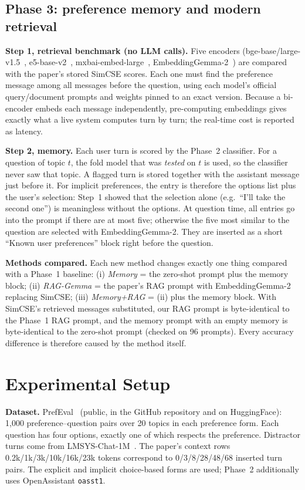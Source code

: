\documentclass[lettersize,journal]{IEEEtran}
\begin{document}
\subsection{Phase 3: preference memory and modern retrieval}
\textbf{Step 1, retrieval benchmark (no LLM calls).} Five encoders (bge-base/large-v1.5~\cite{bge}, e5-base-v2~\cite{e5},
mxbai-embed-large~\cite{mxbai}, EmbeddingGemma-2~\cite{embeddinggemma}) are compared with the paper's stored SimCSE scores. Each one must find the
preference message among all messages before the question, using each model's official query/document prompts and weights pinned to an
exact version. Because a bi-encoder embeds each message independently, pre-computing embeddings gives exactly what a live system computes turn
by turn; the real-time cost is reported as latency.

\textbf{Step 2, memory.} Each user turn is scored by the Phase~2 classifier. For a question of topic $t$, the fold model that was \emph{tested}
on $t$ is used, so the classifier never saw that topic. A flagged turn is stored together with the assistant message just before it. For
implicit preferences, the entry is therefore the options list plus the user's selection: Step~1 showed that the selection alone (e.g.\ ``I'll take
the second one'') is meaningless without the options. At question time, all entries go into the prompt if there are at most five; otherwise
the five most similar to the question are selected with EmbeddingGemma-2. They are inserted as a short ``Known user preferences'' block
right before the question.

\textbf{Methods compared.} Each new method changes exactly one thing compared with a Phase~1 baseline:
(i) \emph{Memory} = the zero-shot prompt plus the memory block;
(ii) \emph{RAG-Gemma} = the paper's RAG prompt with EmbeddingGemma-2 replacing SimCSE;
(iii) \emph{Memory+RAG} = (ii) plus the memory block.
With SimCSE's retrieved messages substituted, our RAG prompt is byte-identical to the Phase~1 RAG prompt, and the memory prompt with an empty
memory is byte-identical to the zero-shot prompt (checked on 96 prompts). Every accuracy difference is therefore caused by the method itself.

\section{Experimental Setup}
\textbf{Dataset.} PrefEval~\cite{prefeval} (public, in the GitHub repository and on HuggingFace): 1{,}000 preference--question pairs over
20 topics in each preference form. Each question has four options, exactly one of which respects the preference. Distractor turns come from
LMSYS-Chat-1M~\cite{lmsys}. The paper's context rows 0.2k/1k/3k/10k/16k/23k tokens correspond to 0/3/8/28/48/68 inserted turn pairs. The
explicit and implicit choice-based forms are used; Phase~2 additionally uses OpenAssistant \texttt{oasst1}.
\end{document}
